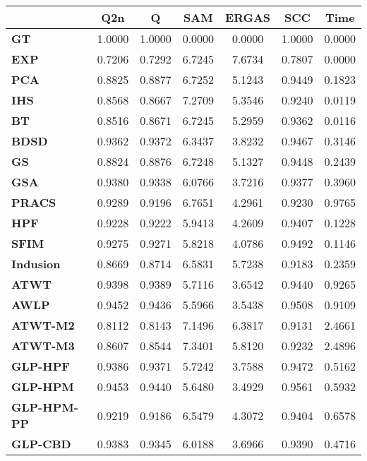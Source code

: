 \begin{tabular}{|l|c|c|c|c|c|c|}
\hline
&\textbf{Q2n}&\textbf{Q}&\textbf{SAM}&\textbf{ERGAS}&\textbf{SCC}&\textbf{Time}\\\hline
\textbf{GT}&1.0000&1.0000&0.0000&0.0000&1.0000&0.0000\\\hline
\textbf{EXP}&0.7206&0.7292&6.7245&7.6734&0.7807&0.0000\\\hline
\textbf{PCA}&0.8825&0.8877&6.7252&5.1243&0.9449&0.1823\\\hline
\textbf{IHS}&0.8568&0.8667&7.2709&5.3546&0.9240&0.0119\\\hline
\textbf{BT}&0.8516&0.8671&6.7245&5.2959&0.9362&0.0116\\\hline
\textbf{BDSD}&0.9362&0.9372&6.3437&3.8232&0.9467&0.3146\\\hline
\textbf{GS}&0.8824&0.8876&6.7248&5.1327&0.9448&0.2439\\\hline
\textbf{GSA}&0.9380&0.9338&6.0766&3.7216&0.9377&0.3960\\\hline
\textbf{PRACS}&0.9289&0.9196&6.7651&4.2961&0.9230&0.9765\\\hline
\textbf{HPF}&0.9228&0.9222&5.9413&4.2609&0.9407&0.1228\\\hline
\textbf{SFIM}&0.9275&0.9271&5.8218&4.0786&0.9492&0.1146\\\hline
\textbf{Indusion}&0.8669&0.8714&6.5831&5.7238&0.9183&0.2359\\\hline
\textbf{ATWT}&0.9398&0.9389&5.7116&3.6542&0.9440&0.9265\\\hline
\textbf{AWLP}&0.9452&0.9436&5.5966&3.5438&0.9508&0.9109\\\hline
\textbf{ATWT-M2}&0.8112&0.8143&7.1496&6.3817&0.9131&2.4661\\\hline
\textbf{ATWT-M3}&0.8607&0.8544&7.3401&5.8120&0.9232&2.4896\\\hline
\textbf{GLP-HPF}&0.9386&0.9371&5.7242&3.7588&0.9472&0.5162\\\hline
\textbf{GLP-HPM}&0.9453&0.9440&5.6480&3.4929&0.9561&0.5932\\\hline
\textbf{GLP-HPM-PP}&0.9219&0.9186&6.5479&4.3072&0.9404&0.6578\\\hline
\textbf{GLP-CBD}&0.9383&0.9345&6.0188&3.6966&0.9390&0.4716\\\hline
\end{tabular}
